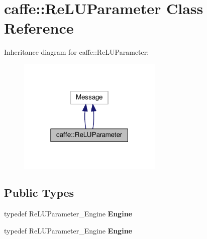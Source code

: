 \hypertarget{classcaffe_1_1_re_l_u_parameter}{}\section{caffe\+:\+:Re\+L\+U\+Parameter Class Reference}
\label{classcaffe_1_1_re_l_u_parameter}


Inheritance diagram for caffe\+:\+:Re\+L\+U\+Parameter\+:
\nopagebreak
\begin{figure}[H]
\begin{center}
\leavevmode
\includegraphics[width=195pt]{classcaffe_1_1_re_l_u_parameter__inherit__graph}
\end{center}
\end{figure}
\subsection*{Public Types}
\begin{DoxyCompactItemize}
\item 
\mbox{\label{classcaffe_1_1_re_l_u_parameter_ad3ac99943bc85163016575dc90e72a26}} 
typedef Re\+L\+U\+Parameter\+\_\+\+Engine {\bfseries Engine}
\item 
\mbox{\label{classcaffe_1_1_re_l_u_parameter_ad3ac99943bc85163016575dc90e72a26}} 
typedef Re\+L\+U\+Parameter\+\_\+\+Engine {\bfseries Engine}
\end{DoxyCompactItemize}
